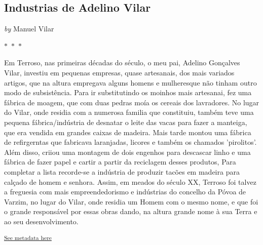 \documentclass{article}
\begin{document}
\begin{center}
\section{Industrias de Adelino Vilar}
\vspace{0.5cm}

    
        \textit{by} Manuel Vilar
    

\vspace{0.75cm}

\vspace{0.75cm}
    $\ast$~$\ast$~$\ast$  


    \begin{center}
        \begin{minipage}{0.9\textwidth}
            \setlength{\parskip}{0.2cm}
            \setlength{\parindent}{0cm}
            \fontsize{12pt}{14pt}\selectfont
            


Em Terroso, nas primeiras décadas do século, o meu pai, Adelino
Gonçalves Vilar, investiu em pequenas empresas, quase artesanais, dos
mais variados artigos, que na altura empregava alguns homens e
mulheresque não tinham outro modo de subsistência. Para ir substitutindo
os moinhos mais artesanai, fez uma fábrica de moagem, que com duas
pedras moía os cereais dos lavradores. No lugar do Vilar, onde residia
com a numerosa familia que constituiu, também teve uma pequena
fábrica/indústria de desnatar o leite das vacas para fazer a manteiga,
que era vendida em grandes caixas de madeira. Mais tarde montou uma
fábrica de refirgerntas que fabricava laranjadas, licores e também os
chamados 'pirolitos'. Além disso, criiou uma montagem de dois engenhos
para descascar linho e uma fábrica de fazer papel e cartir a partir da
reciclagem desses produtos, Para completar a lista recorde-se a
indústria de produzir tacões em madeira para calçado de homem e senhora.
Assim, em meados do século XX, Terroso foi talvez a freguesia com mais
empreendedorismo e indústrias do concelho da Póvoa de Varzim, no lugar
do Vilar, onde residia um Homem com o mesmo nome, e que foi o grande
responsável por essas obras dando, na altura grande nome à sua Terra e
ao seu desenvolvimento.

        \end{minipage}
    \end{center}
\end{center}
    
        \textsuperscript{\hyperref[table:\arabic{tablecounter}]{See metadata here}}
    
\end{document}
